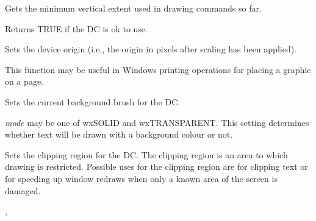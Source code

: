 \label{wxdcminy}


Gets the minimum vertical extent used in drawing commands so far.

\label{wxdcok}


Returns TRUE if the DC is ok to use.

\label{wxdcsetdeviceorigin}


Sets the device origin (i.e., the origin in pixels after scaling has been
applied).

This function may be useful in Windows printing
operations for placing a graphic on a page.

\label{wxdcsetbackground}


Sets the current background brush for the DC.

\label{wxdcsetbackgroundmode}


{\it mode} may be one of wxSOLID and wxTRANSPARENT. This setting determines
whether text will be drawn with a background colour or not.

\label{wxdcsetclippingregion}



Sets the clipping region for the DC. The clipping region is an area
to which drawing is restricted. Possible uses for the clipping region are for clipping text
or for speeding up window redraws when only a known area of the screen is damaged.


, 

\label{wxdcsetpalette}


